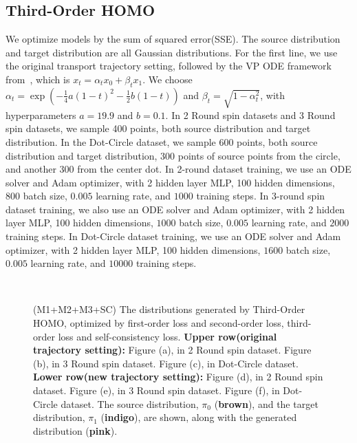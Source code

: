 \subsection{Third-Order HOMO}\label{sec:app:3rd_order_homo}
We optimize models by the sum of squared error(SSE). The source distribution and target distribution are all Gaussian distributions. For the first line, we use the original transport trajectory setting, followed by the VP ODE framework from~\cite{rectified_flow}, which is $x_t = \alpha_t x_0 + \beta_t x_1$. We choose $\alpha_t = \exp(-\frac{1}{4} a(1-t)^2 - \frac{1}{2} b(1-t))$ and $\beta_t = \sqrt{1 - \alpha_t^2}$, with hyperparameters $a = 19.9$ and $b = 0.1$. In 2 Round spin datasets and 3 Round spin datasets, we sample 400 points, both source distribution and target distribution. In the Dot-Circle dataset, we sample 600 points, both source distribution and target distribution, 300 points of source points from the circle, and another 300 from the center dot. In 2-round dataset training, we use an ODE solver and Adam optimizer, with 2 hidden layer MLP, 100 hidden dimensions, $800$ batch size, $0.005$ learning rate, and $1000$ training steps. In 3-round spin dataset training, we also use an ODE solver and Adam optimizer, with 2 hidden layer MLP, 100 hidden dimensions, $1000$ batch size, $0.005$ learning rate, and $2000$ training steps. In Dot-Circle dataset training, we use an ODE solver and Adam optimizer, with 2 hidden layer MLP, 100 hidden dimensions, $1600$ batch size, $0.005$ learning rate, and $10000$ training steps. 

\begin{figure}[!ht]
\centering
{}
\\
\caption{
(M1+M2+M3+SC) The distributions generated by Third-Order HOMO, optimized by first-order loss and second-order loss, third-order loss and self-consistency loss. 
\textbf{Upper row(original trajectory setting):}
Figure (a), in 2 Round spin dataset. Figure (b), in 3 Round spin dataset. 
Figure (c), in Dot-Circle dataset. 
\textbf{Lower row(new trajectory setting):}
Figure (d), in 2 Round spin dataset. 
Figure (e), in 3 Round spin dataset. 
Figure (f), in Dot-Circle dataset. 
The source distribution, $\pi_0$ ({\textbf{brown}}), and the target distribution, $\pi_1$ ({\textbf{indigo}}), are shown, along with the generated distribution ({\textbf{pink}}). 
}
\label{fig:3rd_order_homo}
\end{figure}
